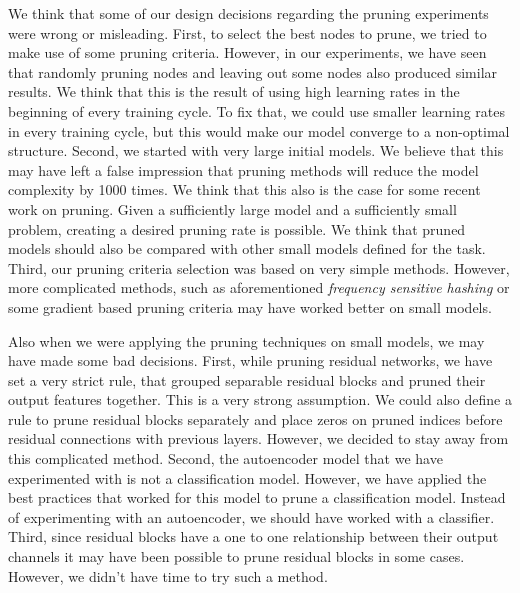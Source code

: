 We think that some of our design decisions regarding the pruning experiments were wrong or misleading. First, to select the best nodes to prune, we tried to make use of some pruning criteria. However, in our experiments, we have seen that randomly pruning nodes and leaving out some nodes also produced similar results. We think that this is the result of using high learning rates in the beginning of every training cycle. To fix that, we could use smaller learning rates in every training cycle, but this would make our model converge to a non-optimal structure. Second, we started with very large initial models. We believe that this may have left a false impression that pruning methods will reduce the model complexity by 1000 times. We think that this also is the case for some recent work on pruning. Given a sufficiently large model and a sufficiently small problem, creating a desired pruning rate is possible. We think that pruned models should also be compared with other small models defined for the task. Third, our pruning criteria selection was based on very simple methods. However, more complicated methods, such as aforementioned \textit{frequency sensitive hashing} or some gradient based pruning criteria may have worked better on small models. 

Also when we were applying the pruning techniques on small models, we may have made some bad decisions. First, while pruning residual networks, we have set a very strict rule, that grouped separable residual blocks and pruned their output features together. This is a very strong assumption. We could also define a rule to prune residual blocks separately and place zeros on pruned indices before residual connections with previous layers. However, we decided to stay away from this complicated method. Second, the autoencoder model that we have experimented with is not a classification model. However, we have applied the best practices that worked for this model to prune a classification model. Instead of experimenting with an autoencoder, we should have worked with a classifier. Third, since residual blocks have a one to one relationship between their output channels it may have been possible to prune residual blocks in some cases. However, we didn't have time to try such a method.

